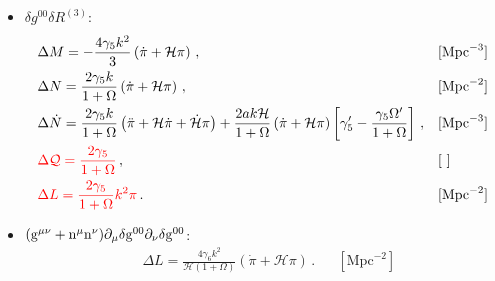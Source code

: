 \documentclass[prd,nofootinbib,showpacs]{revtex4}
\def\l{\left}
\def\r{\right}
\def\f{\frac}
\def\hub{{\mathcal H}}
\begin{document}
{\begin{itemize}
{\begin{align}
%
\Delta{ Y} =& \f{1}{2(1+\Omega)}\l(\gamma_4+a\f{\gamma_4^\prime}{2} \r) \, ,& &  [\,\,]  \ \nonumber \\
%
\Delta{ M} =& -\gamma_4\l(\dot{\hub}-\hub^2-\f{k^2}{3}\r)\dot{\pi} -2\hub\l(\gamma_4+a\f{\gamma_4^\prime}{2} \r)\l(\dot{\hub}-\hub^2-\f{k^2}{3} \r)\pi -\gamma_4\l(\ddot{\hub}-2\hub\dot{\hub}\r)\pi  \, ,& &  [\text{Mpc}^{-3}] \,\nonumber\\
%
\Delta{ U} =& \f{\gamma_4}{2(1+\Omega)} \, . & &  [\,\,]  \,
\end{align}}
%
\item[] \underline{$\delta g^{00}\delta R^{(3)}$}:\\
{\small
\begin{align}\label{Eq:ContribGamma5}
%
&\Delta{ M}=-\f{4\gamma_5k^2}{3}\l(\dot{\pi}+\hub\pi \r) \, , & &  [\text{Mpc}^{-3}] \, \nonumber\\
%
&\Delta{ N}=\f{2\gamma_5k}{1+\Omega}\left(\dot{\pi}+\hub\pi\right) \, , & &  [\text{Mpc}^{-2}] \, \nonumber\\
%
&\Delta\dot{N} = \f{2\gamma_5k}{1+\Omega}\l(\ddot{\pi}+\hub\dot{\pi}+\dot{\hub}\pi\r)+\f{2ak\hub}{1+\Omega}\l(\dot{\pi}+\hub\pi\r)\l[ \gamma_5^\prime-\f{\gamma_5\Omega'}{1+\Omega}\r]  \, ,& &  [\text{Mpc}^{-3}] \,\nonumber\\
&\textcolor{red}{\Delta\mathcal{Q}= \f{2\gamma_5}{1+\Omega}}\,, & & [\,\, ] \nonumber \\
&\textcolor{red}{\Delta L= \f{2\gamma_5}{1+\Omega}k^2 \pi}\,.& &  [\text{Mpc}^{-2}]
\end{align}}
%
\item[] \underline{ $\rm(g^{\mu\nu}+n^\mu n^\nu)\partial_\mu\delta g^{00}\partial_\nu \delta g^{00}$}:\\
{\small
\begin{align}\label{Eq:ContribGamma6}
%
&\Delta{ L}= \f{4\gamma_6k^2}{\hub(1+\Omega)}\l(\dot{\pi}+\hub\pi\r) \, . & &  [\text{Mpc}^{-2}] \,
\end{align}}
\end{itemize}
%
}
\end{document}
